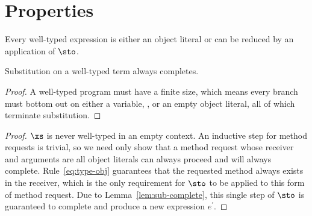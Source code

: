 \section{Properties}

\begin{theorem}[Progress]
  \label{th:progress}

  Every well-typed expression is either an object literal or can be reduced by
  an application of $\sto$.

  \begin{lemma}
    \label{lem:sub-complete}

    Substitution on a well-typed term always completes.

    \begin{proof}
      A well-typed program must have a finite size, which means every branch
      must bottom out on either a variable, \self, or an empty object literal,
      all of which terminate substitution.
    \end{proof}
  \end{lemma}

  \begin{proof}
    $\xs$ is never well-typed in an empty context.  An inductive step for method
    requests is trivial, so we need only show that a method request whose
    receiver and arguments are all object literals can always proceed and will
    always complete.  Rule~\ref{eq:type-obj} guarantees that the requested
    method always exists in the receiver, which is the only requirement for
    $\sto$ to be applied to this form of method request.  Due to
    Lemma~\ref{lem:sub-complete}, this single step of $\sto$ is guaranteed to
    complete and produce a new expression $e^\prime$.
  \end{proof}
\end{theorem}

